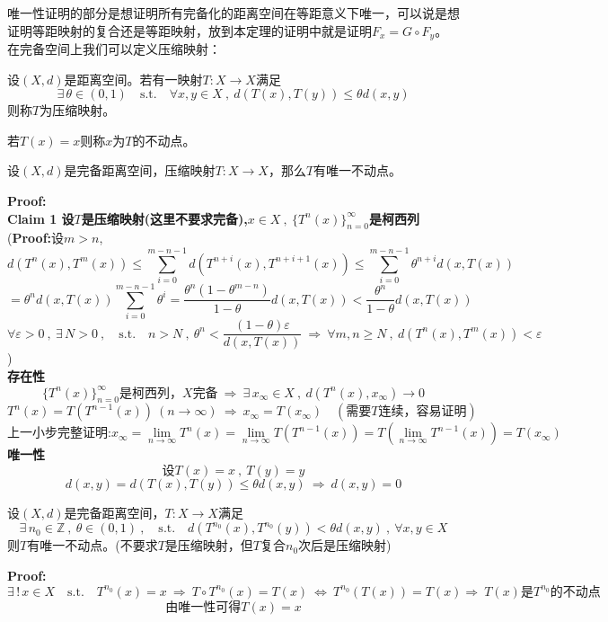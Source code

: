 唯一性证明的部分是想证明所有完备化的距离空间在等距意义下唯一，可以说是想证明等距映射的复合还是等距映射，放到本定理的证明中就是证明$F_x=G \circ F_y$。
\newpage
在完备空间上我们可以定义压缩映射：
\begin{definition}[压缩映射]
    设$(X,d)$是距离空间。若有一映射$T:X \to X$满足
    \[\exists \, \theta \in (0,1) \quad \text{s.t.} \quad \forall x,y \in X \ , \ d(T(x),T(y)) \leq \theta d(x,y)\]
    则称$T$为压缩映射。
\end{definition}
\begin{definition}[不动点]
    若$T(x)=x$则称$x$为$T$的不动点。
\end{definition}
\begin{theorem}[压缩映射原理]
    设$(X,d)$是完备距离空间，压缩映射$T:X \to X$，那么$T$有唯一不动点。
\end{theorem}
\textbf{Proof:}\\
\textbf{Claim 1 设$T$是压缩映射(这里不要求完备),$x \in X \ , \ \{T^n(x)\}_{n=0}^{\infty}$是柯西列}\\
(\textbf{Proof:}设$m>n$,
\[d(T^n(x),T^m(x)) \leq \sum_{i=0}^{m-n-1}d(T^{n+i}(x),T^{n+i+1}(x)) \leq \sum_{i=0}^{m-n-1}\theta^{n+i}d(x,T(x))\]
\[=\theta^nd(x,T(x))\sum_{i=0}^{m-n-1}\theta^i=\frac{\theta^n(1-\theta^{m-n})}{1-\theta}d(x,T(x)) < \frac{\theta^n}{1-\theta}d(x,T(x))\]
\[\forall \varepsilon>0 \ , \ \exists \, N>0 \ , \quad \text{s.t.} \quad n>N \ , \ \theta^n<\frac{(1-\theta)\varepsilon}{d(x,T(x))} \ \Rightarrow \ \forall m,n \geq N \ , \ d(T^n(x),T^m(x))<\varepsilon\]
)\\
\textbf{存在性}
\[\{T^n(x)\}_{n=0}^{\infty}\text{是柯西列，}X\text{完备} \ \Rightarrow \ \exists \, x_{\infty} \in X \ , \ d(T^n(x),x_{\infty}) \to 0\]
\[T^n(x)=T\left(T^{n-1}(x)\right) \ (n \to \infty) \ \Rightarrow \ x_{\infty}=T(x_{\infty}) \quad (\text{需要}T\text{连续，容易证明})\]
\[\text{上一小步完整证明:}x_{\infty}=\lim_{n \to \infty}T^n(x)=\lim_{n \to \infty}T(T^{n-1}(x))=T(\lim_{n \to \infty}T^{n-1}(x))=T(x_{\infty})\]
\textbf{唯一性}
\[\text{设}T(x)=x \ , \ T(y)=y\]
\[d(x,y)=d(T(x),T(y)) \leq \theta d(x,y) \ \Rightarrow \ d(x,y)=0\]
\begin{proposition}[推广的压缩映射原理]
    设$(X,d)$是完备距离空间，$T:X \to X$满足
    \[\exists \, n_0 \in \mathbb{Z} \ , \ \theta \in (0,1) \ , \quad \text{s.t.} \quad d(T^{n_0}(x),T^{n_0}(y))<\theta d(x,y) \ , \ \forall x,y \in X\]
    则$T$有唯一不动点。(不要求$T$是压缩映射，但$T$复合$n_0$次后是压缩映射)
\end{proposition}
\textbf{Proof:}
\[\exists \, ! \, x \in X \quad \text{s.t.} \quad T^{n_0}(x)=x \ \Rightarrow \ T \circ T^{n_0}(x)=T(x) \ \Leftrightarrow \ T^{n_0}(T(x))=T(x) \Rightarrow \ T(x)\text{是}T^{n_0}\text{的不动点}\]
\[\text{由唯一性可得}T(x)=x\]

